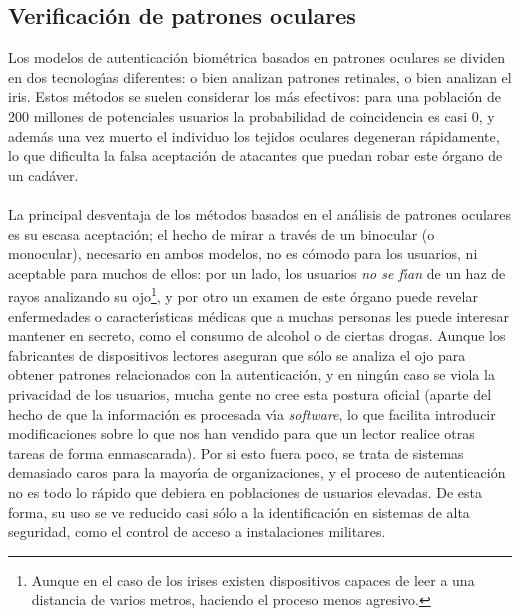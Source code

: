 \subsection{Verificaci\'on de patrones oculares}  
Los modelos de autenticaci\'on biom\'etrica basados en patrones oculares se
dividen en dos tecnolog\'{\i}as diferentes: o bien analizan patrones retinales,
o bien analizan el iris. Estos m\'etodos se suelen considerar los m\'as 
efectivos: para una poblaci\'on de 200 millones de potenciales usuarios la 
probabilidad de coincidencia es casi 0, y adem\'as una vez muerto el individuo 
los tejidos oculares degeneran r\'apidamente, lo que dificulta la falsa 
aceptaci\'on de atacantes que puedan robar este \'organo de un cad\'aver.\\
\\La principal desventaja de los m\'etodos basados en el an\'alisis de patrones
oculares es su escasa aceptaci\'on; el hecho de mirar a trav\'es de 
un binocular (o monocular), necesario en ambos modelos, no es c\'omodo para los 
usuarios, ni aceptable para muchos de ellos: por un lado, los usuarios {\it no 
se f\'{\i}an} de un haz de rayos analizando su ojo\footnote{Aunque en el
caso de los irises existen 
dispositivos capaces de leer a una distancia de varios metros, haciendo el 
proceso menos agresivo.}, y por otro un examen de este
\'organo puede revelar enfermedades o caracter\'{\i}sticas m\'edicas que a 
muchas personas les puede interesar mantener en secreto, como el consumo de 
alcohol o
de ciertas drogas. Aunque los fabricantes de dispositivos lectores aseguran que 
s\'olo se analiza el ojo para obtener patrones relacionados con la 
autenticaci\'on, y en ning\'un caso se viola la privacidad de los usuarios, 
mucha gente no cree esta postura oficial (aparte del hecho de que la 
informaci\'on es procesada v\'{\i}a {\it software}, lo que facilita introducir
modificaciones sobre lo que nos han vendido para que un lector realice otras
tareas de forma enmascarada). Por si esto fuera poco, se trata de sistemas 
demasiado caros para la mayor\'{\i}a de organizaciones, y el proceso de
autenticaci\'on no es todo lo r\'apido que debiera en poblaciones de usuarios
elevadas. De esta forma, su uso se ve reducido casi s\'olo a la 
identificaci\'on en sistemas de alta seguridad, como el control de acceso a 
instalaciones militares.
